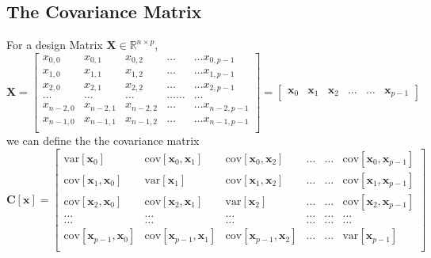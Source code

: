 \documentclass[11pt,a4paper,notitlepage]{article}
\begin{document}
\subsection{The Covariance Matrix}
For a design Matrix $\boldsymbol{X}\in {\mathbb{R}}^{n\times p}$, 
\begin{equation}
\boldsymbol{X}=\begin{bmatrix}
x_{0,0} & x_{0,1} & x_{0,2}& \dots & \dots x_{0,p-1}\\
x_{1,0} & x_{1,1} & x_{1,2}& \dots & \dots x_{1,p-1}\\
x_{2,0} & x_{2,1} & x_{2,2}& \dots & \dots x_{2,p-1}\\
\dots & \dots & \dots & \dots \dots & \dots \\
x_{n-2,0} & x_{n-2,1} & x_{n-2,2}& \dots & \dots x_{n-2,p-1}\\
x_{n-1,0} & x_{n-1,1} & x_{n-1,2}& \dots & \dots x_{n-1,p-1}\\
\end{bmatrix}=\begin{bmatrix} \boldsymbol{x}_0 & \boldsymbol{x}_1 & \boldsymbol{x}_2 & \dots & \dots & \boldsymbol{x}_{p-1}\end{bmatrix}
\end{equation}
we can define the the covariance matrix
\begin{equation}
\boldsymbol{C}[\boldsymbol{x}] = \begin{bmatrix}
\mathrm{var}[\boldsymbol{x}_0] & \mathrm{cov}[\boldsymbol{x}_0,\boldsymbol{x}_1]  & \mathrm{cov}[\boldsymbol{x}_0,\boldsymbol{x}_2] & \dots & \dots & \mathrm{cov}[\boldsymbol{x}_0,\boldsymbol{x}_{p-1}]\\
\mathrm{cov}[\boldsymbol{x}_1,\boldsymbol{x}_0] & \mathrm{var}[\boldsymbol{x}_1]  & \mathrm{cov}[\boldsymbol{x}_1,\boldsymbol{x}_2] & \dots & \dots & \mathrm{cov}[\boldsymbol{x}_1,\boldsymbol{x}_{p-1}]\\
\mathrm{cov}[\boldsymbol{x}_2,\boldsymbol{x}_0]   & \mathrm{cov}[\boldsymbol{x}_2,\boldsymbol{x}_1] & \mathrm{var}[\boldsymbol{x}_2] & \dots & \dots & \mathrm{cov}[\boldsymbol{x}_2,\boldsymbol{x}_{p-1}]\\
\dots & \dots & \dots & \dots & \dots & \dots \\
\dots & \dots & \dots & \dots & \dots & \dots \\
\mathrm{cov}[\boldsymbol{x}_{p-1},\boldsymbol{x}_0]   & \mathrm{cov}[\boldsymbol{x}_{p-1},\boldsymbol{x}_1] & \mathrm{cov}[\boldsymbol{x}_{p-1},\boldsymbol{x}_{2}]  & \dots & \dots  & \mathrm{var}[\boldsymbol{x}_{p-1}]\\
\end{bmatrix}
\end{equation}
\end{document}
